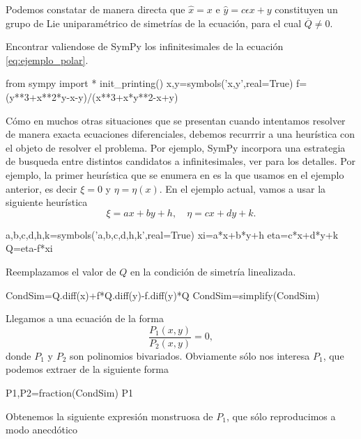 Podemos constatar de manera directa que $\hat{x}=x$ e $\hat{y}=c\epsilon x+y$ constituyen un grupo de Lie uniparamétrico de simetrías de la ecuación, para el cual $\overline{Q}\neq 0$.


 \begin{ejemplo}{} Encontrar valiendose de SymPy los infinitesimales  de la ecuación \eqref{eq:ejemplo_polar}.
   \end{ejemplo}
   
\begin{sympyblock}[][frame=single]
from sympy import *
init_printing()
x,y=symbols('x,y',real=True)
f=(y**3+x**2*y-x-y)/(x**3+x*y**2-x+y)
\end{sympyblock}

Cómo en muchos otras situaciones que se presentan cuando intentamos resolver de manera exacta ecuaciones diferenciales,  debemos recurrrir a una heurística  con el objeto de resolver  el problema. Por ejemplo, SymPy incorpora una estrategia de busqueda entre distintos candidatos a infinitesimales, ver \cite{Lie_Sympy,cheb1997computer} para los detalles. Por ejemplo, la primer heurística que se enumera en \cite{Lie_Sympy} es la que usamos en el ejemplo anterior, es decir $\xi=0$ y $\eta=\eta(x)$. En el ejemplo actual, vamos a usar la siguiente heurística
 \[\xi=ax+by+h,\quad \eta=cx+dy+k.\]
\begin{sympyblock}[][frame=single]
a,b,c,d,h,k=symbols('a,b,c,d,h,k',real=True)
xi=a*x+b*y+h
eta=c*x+d*y+k
Q=eta-f*xi
\end{sympyblock}

Reemplazamos el valor de $Q$ en la condición de simetría linealizada.
\begin{sympyblock}[][frame=single]
CondSim=Q.diff(x)+f*Q.diff(y)-f.diff(y)*Q
CondSim=simplify(CondSim)
\end{sympyblock}
Llegamos a una ecuación de la forma
\[
 \frac{P_1(x,y)}{P_2(x,y)}=0,
\]
donde $P_1$ y $P_2$  son polinomios bivariados. Obviamente sólo nos interesa $P_1$, que podemos extraer de la siguiente forma 
\begin{sympyblock}[][frame=single]
P1,P2=fraction(CondSim)
P1
\end{sympyblock}
Obtenemos la siguiente expresión  monstruosa de $P_1$, que sólo reproducimos a modo anecdótico

